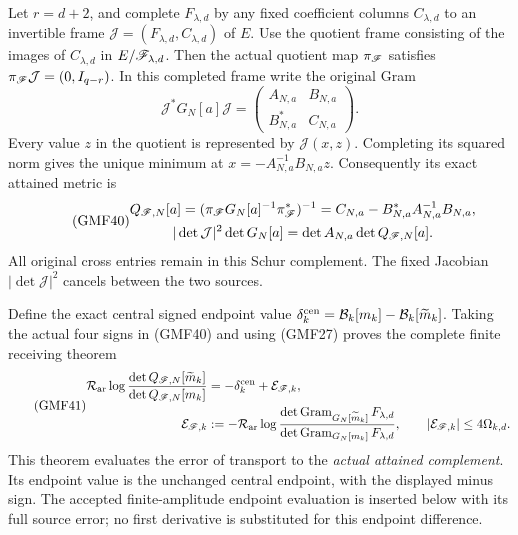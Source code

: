 Let \(r=d+2\), and complete \(F_{\lambda,d}\) by any fixed
coefficient columns \(C_{\lambda,d}\) to an invertible frame
\(\mathcal J=(F_{\lambda,d},C_{\lambda,d})\) of \(E\).
Use the quotient frame consisting of the images of
\(C_{\lambda,d}\) in \(E/\mathscr F_{\lambda,d}\).
Then the actual quotient map \(\pi_\mathscr F\) satisfies
\(\pi_\mathscr F\mathcal J=(0,I_{q-r})\).
In this completed frame write the original Gram
\[
 \mathcal J^*G_N[a]\mathcal J=
 \begin{pmatrix}A_{N,a}&B_{N,a}\\B_{N,a}^*&C_{N,a}\end{pmatrix}.
\]
Every value \(z\) in the quotient is represented by
\(\mathcal J(x,z)\).  Completing its squared norm gives
the unique minimum at \(x=-A_{N,a}^{-1}B_{N,a}z\).
Consequently its exact attained metric is
\begin{equation}\tag{GMF40}
\begin{gathered}
 Q_{\mathscr F,N}[a]
 =(\pi_\mathscr F G_N[a]^{-1}\pi_\mathscr F^*)^{-1}
 =C_{N,a}-B_{N,a}^*A_{N,a}^{-1}B_{N,a},\\
 |\det\mathcal J|^2\det G_N[a]
   =\det A_{N,a}\det Q_{\mathscr F,N}[a].
\end{gathered}
\end{equation}
All original cross entries remain in this Schur complement.
The fixed Jacobian \(|\det\mathcal J|^2\) cancels between
the two sources.

Define the exact central signed endpoint value
\(\delta_k^{\rm cen}=\mathcal B_k[m_k]-\mathcal B_k[\widetilde m_k]\).
Taking the actual four signs in (GMF40) and using (GMF27)
proves the complete finite receiving theorem
\begin{equation}\tag{GMF41}
\begin{split}
 \mathcal R_{\rm ar}
 \log\frac{\det Q_{\mathscr F,N}[\widetilde m_k]}
              {\det Q_{\mathscr F,N}[m_k]}
 &=-\delta_k^{\rm cen}+\mathcal E_{\mathscr F,k},\\
 \mathcal E_{\mathscr F,k}
 &:=-\mathcal R_{\rm ar}
 \log\frac{\det\operatorname{Gram}_{G_N[\widetilde m_k]}F_{\lambda,d}}
              {\det\operatorname{Gram}_{G_N[m_k]}F_{\lambda,d}},
 \qquad |\mathcal E_{\mathscr F,k}|\le4\Omega_{k,d}.
\end{split}
\end{equation}
This theorem evaluates the error of transport to the
\emph{actual attained complement}.  Its endpoint value is
the unchanged central endpoint, with the displayed minus
sign.  The accepted finite-amplitude endpoint evaluation is
inserted below with its full source error; no first
derivative is substituted for this endpoint difference.

